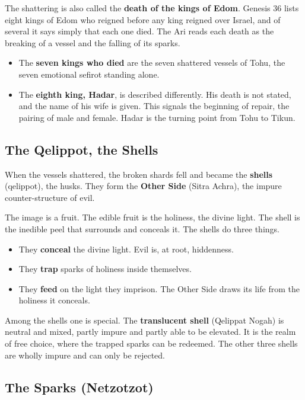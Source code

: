 The shattering is also called the \textbf{death of the kings of Edom}. Genesis 36 lists eight kings of
Edom who reigned before any king reigned over Israel, and of several it says simply that each one died.
The Ari reads each death as the breaking of a vessel and the falling of its sparks.

\begin{itemize}
 \item The \textbf{seven kings who died} are the seven shattered vessels of Tohu, the seven emotional
 sefirot standing alone.
 \item The \textbf{eighth king, Hadar}, is described differently. His death is not stated, and the name
 of his wife is given. This signals the beginning of repair, the pairing of male and female. Hadar is
 the turning point from Tohu to Tikun.
\end{itemize}

\subsection{The Qelippot, the Shells}

When the vessels shattered, the broken shards fell and became the \textbf{shells} (qelippot), the
husks. They form the \textbf{Other Side} (Sitra Achra), the impure counter-structure of evil.

The image is a fruit. The edible fruit is the holiness, the divine light. The shell is the inedible peel
that surrounds and conceals it. The shells do three things.

\begin{itemize}
 \item They \textbf{conceal} the divine light. Evil is, at root, hiddenness.
 \item They \textbf{trap} sparks of holiness inside themselves.
 \item They \textbf{feed} on the light they imprison. The Other Side draws its life from the holiness
 it conceals.
\end{itemize}

Among the shells one is special. The \textbf{translucent shell} (Qelippat Nogah) is neutral and mixed,
partly impure and partly able to be elevated. It is the realm of free choice, where the trapped sparks
can be redeemed. The other three shells are wholly impure and can only be rejected.

\subsection{The Sparks (Netzotzot)}

